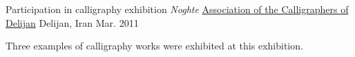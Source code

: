 \begin{cventries}
  \cventry
  {Participation in calligraphy exhibition \emph{Noghte}} %
  {\href{http://calligraphers.ir/}{Association of the Calligraphers of Delijan}} %
  {Delijan, Iran} %
  {Mar. 2011} %
  {
    \begin{cvitems} %
      \item {Three examples of calligraphy works were exhibited at this exhibition.}
    \end{cvitems}
  }

\end{cventries}
